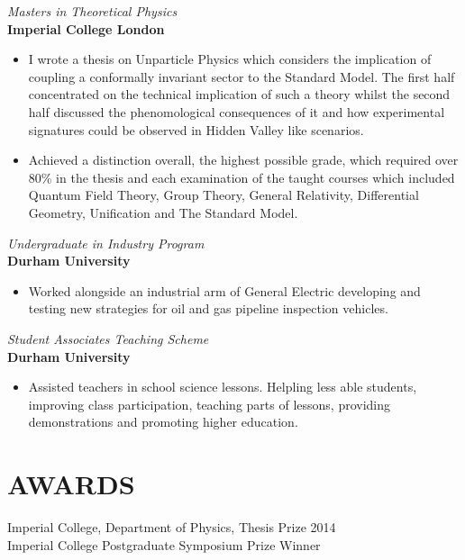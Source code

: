 \documentclass[margin, 10pt]{res} %
\begin{document}
\begin{resume}
{\sl Masters in Theoretical Physics}\\
{\bf Imperial College London}
\begin{itemize} \itemsep -2pt %
\item I wrote a thesis on Unparticle Physics which considers the implication of coupling a conformally invariant sector to the Standard Model. The first half concentrated on the technical implication of such a theory whilst the second half discussed the phenomological consequences of it and how experimental signatures could be observed in Hidden Valley like scenarios.
\item Achieved a distinction overall, the highest possible grade, which required over 80\% in the thesis and each examination of the taught courses which included Quantum Field Theory, Group Theory, General Relativity, Differential Geometry, Unification and The Standard Model.
\end{itemize}

{\sl Undergraduate in Industry Program}\\
{\bf Durham University}
\begin{itemize} \itemsep -2pt %
\item Worked alongside an industrial arm of General Electric developing and testing new strategies for oil and gas pipeline inspection vehicles.
\end{itemize}

{\sl Student Associates Teaching Scheme}\\
{\bf Durham University}
\begin{itemize} \itemsep -2pt %
\item Assisted teachers in school science lessons. Helpling less able students, improving class participation, teaching parts of lessons, providing demonstrations and promoting higher education.
\end{itemize}

\section{AWARDS}

Imperial College, Department of Physics, Thesis Prize 2014 \\
Imperial College Postgraduate Symposium Prize Winner \\


\end{resume}
\end{document}
